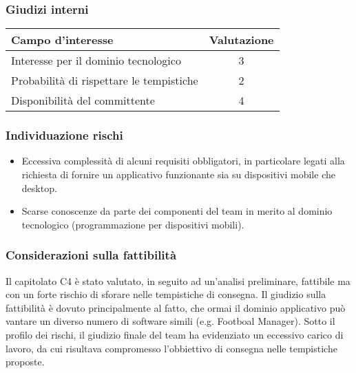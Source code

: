\subsubsection{Giudizi interni}
\begin{center}
\begin{tabular}{lc}
\toprule
Campo d'interesse & Valutazione\\
\midrule %
Interesse per il dominio tecnologico & 3\\
Probabilità di rispettare le tempistiche & 2\\
Disponibilità del committente & 4\\
\bottomrule
\end{tabular}
\end{center}
\subsubsection{Individuazione rischi}
\begin{itemize}
	\item Eccessiva complessità di alcuni requisiti obbligatori, in particolare legati alla richiesta di fornire un applicativo funzionante sia su dispositivi mobile che desktop.
	\item Scarse conoscenze da parte dei componenti del team in merito al dominio tecnologico (programmazione per dispositivi mobili).
\end{itemize}
\subsubsection{Considerazioni sulla fattibilità}
Il capitolato C4 è stato valutato, in seguito ad un'analisi preliminare, fattibile ma con un forte rischio di sforare nelle tempistiche di consegna. Il giudizio sulla fattibilità è dovuto principalmente al fatto, che ormai il dominio applicativo può vantare un diverso numero di software simili (e.g. Footboal Manager). Sotto il profilo dei rischi, il giudizio finale del team ha evidenziato un eccessivo carico di lavoro, da cui risultava compromesso l'obbiettivo di consegna nelle tempistiche proposte.




